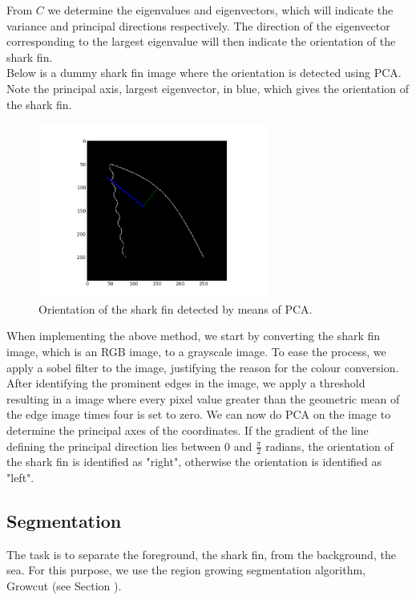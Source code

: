 \documentclass[a4paper,10pt]{article}
\begin{document}
From $C$ we determine the eigenvalues and eigenvectors, which will indicate the variance and principal directions respectively.
The direction of the eigenvector corresponding to the largest eigenvalue will then indicate the orientation of the shark fin. \\
 
Below is a dummy shark fin image where the orientation is detected using PCA.  Note the principal axis, largest eigenvector, in blue, which gives the orientation of the shark fin.

\begin{figure}[H]
 \centering
 \includegraphics[width=3in]{orientation.jpg}
 \caption{Orientation of the shark fin detected by means of PCA.}
 \label{orientation}
\end{figure}

When implementing the above method, we start by converting the shark fin image, which is an RGB image, to a grayscale image.  To ease the process,
we apply a sobel filter to the image, justifying the reason for the colour conversion.  After identifying the prominent edges in the image, we apply a 
threshold resulting in a image where every pixel value greater than the geometric mean of the edge image times four is set to zero.  We can now do PCA on
the image to determine the principal axes of the coordinates.  If the gradient of the line defining the principal direction lies between 0 and $\frac{\pi}{2}$ 
radians, the orientation of the shark fin is identified as "right", otherwise the orientation is identified as "left". 

\subsection{Segmentation}
The task is to separate the foreground, the shark fin, from the background, the sea.  For this purpose, we use the region growing segmentation algorithm,
Growcut (see Section ). 
\end{document}
